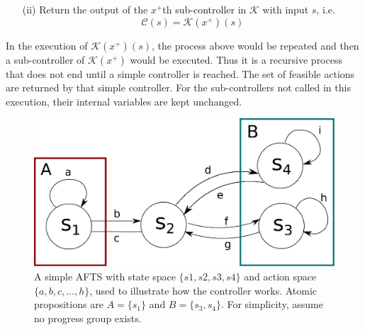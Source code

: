 \begin{definition}
\begin{itemize}
		\item[(ii)] Return the output of the $ x^+ $th sub-controller in $ \mathcal{K} $ with input $ s $, i.e.
		\begin{displaymath}
		\mathcal{C}(s) = \mathcal{K}(x^+)(s)
		\end{displaymath}
	\end{itemize}
	
	In the execution of $ \mathcal{K}(x^+)(s) $, the process above would be repeated and then a sub-controller of $ \mathcal{K}(x^+) $ would be executed. Thus it is a recursive process that does not end until a simple controller is reached.
	The set of feasible actions are returned by that simple controller. For the sub-controllers not called in this execution, their internal variables are kept unchanged.
	
	
	\label{def:exec}
\end{definition}


\begin{figure}
	\centering
	\includegraphics[width=0.4\linewidth]{pic/eg1}
	\caption{A simple AFTS with state space $\{s1,s2,s3,s4\}$ and action space $\{a,b,c, ...,h\}$, used to illustrate how the controller works. Atomic propositions are $ A =\{s_1\} $ and $ B=\{s_3, s_4\} $. For simplicity, assume no progress group exists.}  
	\label{fig:eg1}
\end{figure}

